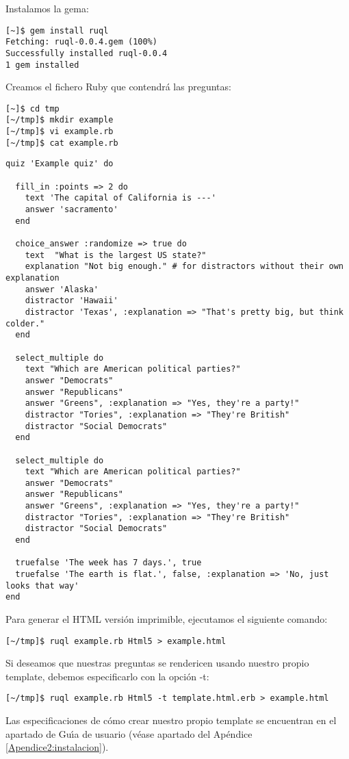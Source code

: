 Instalamos la gema:

\begin{verbatim}
[~]$ gem install ruql
Fetching: ruql-0.0.4.gem (100%)
Successfully installed ruql-0.0.4
1 gem installed
\end{verbatim}

Creamos el fichero Ruby que contendr\'a las preguntas:

\begin{verbatim}
[~]$ cd tmp
[~/tmp]$ mkdir example
[~/tmp]$ vi example.rb
[~/tmp]$ cat example.rb 
\end{verbatim}

\begin{lstlisting}
quiz 'Example quiz' do
  
  fill_in :points => 2 do
    text 'The capital of California is ---'
    answer 'sacramento'
  end
  
  choice_answer :randomize => true do
    text  "What is the largest US state?"
    explanation "Not big enough." # for distractors without their own explanation
    answer 'Alaska'
    distractor 'Hawaii'
    distractor 'Texas', :explanation => "That's pretty big, but think colder."
  end
  
  select_multiple do
    text "Which are American political parties?"
    answer "Democrats"
    answer "Republicans"
    answer "Greens", :explanation => "Yes, they're a party!"
    distractor "Tories", :explanation => "They're British"
    distractor "Social Democrats"
  end
  
  select_multiple do
    text "Which are American political parties?"
    answer "Democrats"
    answer "Republicans"
    answer "Greens", :explanation => "Yes, they're a party!"
    distractor "Tories", :explanation => "They're British"
    distractor "Social Democrats"
  end
  
  truefalse 'The week has 7 days.', true
  truefalse 'The earth is flat.', false, :explanation => 'No, just looks that way'
end
\end{lstlisting}
\bigskip

Para generar el HTML versi\'on imprimible, ejecutamos el siguiente comando:

\begin{verbatim}
[~/tmp]$ ruql example.rb Html5 > example.html
\end{verbatim}

Si deseamos que nuestras preguntas se rendericen usando nuestro propio template, debemos especificarlo con la opci\'on -t:

\begin{verbatim}
[~/tmp]$ ruql example.rb Html5 -t template.html.erb > example.html
\end{verbatim}

Las especificaciones de c\'omo crear nuestro propio template se encuentran en el apartado de Gu\'{\i}a de usuario (v\'ease apartado del Ap\'endice \ref{Apendice2:instalacion}).